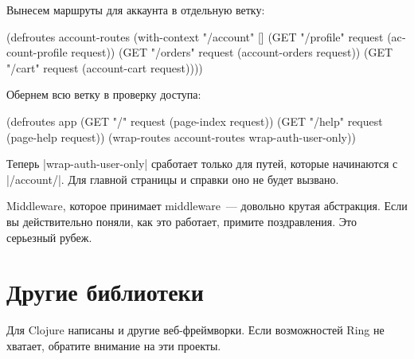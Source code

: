 \noindent
Вынесем маршруты для аккаунта в отдельную ветку:

\begin{english}
  \begin{clojure}
(defroutes account-routes
  (with-context "/account" []
    (GET "/profile" request (account-profile request))
    (GET "/orders" request (account-orders request))
    (GET "/cart" request (account-cart request))))
  \end{clojure}
\end{english}

\noindent
Обернем всю ветку в проверку доступа:

\begin{english}
  \begin{clojure}
(defroutes app
  (GET "/" request (page-index request))
  (GET "/help" request (page-help request))
  (wrap-routes account-routes wrap-auth-user-only))
  \end{clojure}
\end{english}

Теперь \spverb|wrap-auth-user-only| сработает только для путей, которые
начинаются с \spverb|/account/|. Для главной страницы и справки оно не будет
вызвано.

Middleware, которое принимает middleware~--- довольно крутая абстракция. Если вы
действительно поняли, как это работает, примите поздравления. Это серьезный
рубеж.

\section{Другие библиотеки}

Для Clojure написаны и другие веб-фреймворки. Если возможностей Ring не
хватает, обратите внимание на эти проекты.

